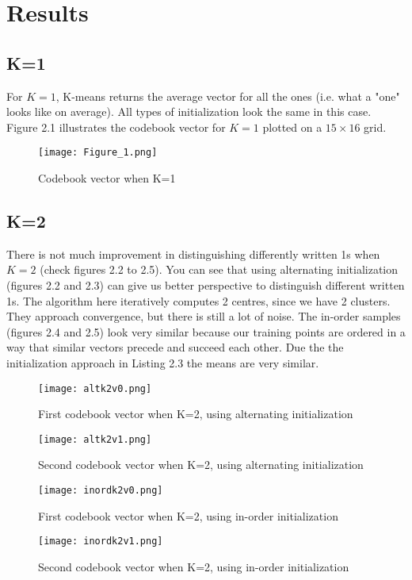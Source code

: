 \documentclass[a4paper, 11pt]{report}
\begin{document}
\section{Results}
\subsection{K=1}
For $K = 1$, K-means returns the average vector for all the ones (i.e. what a "one" looks like on average). All types of initialization look the same in this case. Figure 2.1 illustrates the codebook vector for $K = 1$ plotted on a $15 \times 16$ grid.
\begin{figure}[!ht]
    \texttt{[image: Figure\_1.png]}
    \caption{Codebook vector when K=1}
\end{figure}

\subsection{K=2}
There is not much improvement in distinguishing differently written 1s when $K=2$ (check figures 2.2 to 2.5). You can see that using alternating initialization (figures 2.2 and 2.3) can give us better perspective to distinguish different written 1s. The algorithm here iteratively computes 2 centres, since we have 2 clusters. They approach convergence, but there is still a lot of noise. The in-order samples (figures 2.4 and 2.5) look very similar because our training points are ordered in a way that similar vectors precede and succeed each other. Due the the initialization approach in Listing 2.3 the means are very similar.
\begin{figure}[!ht]
    \texttt{[image: altk2v0.png]}
    \caption{First codebook vector when K=2, using alternating initialization}
    \texttt{[image: altk2v1.png]}
    \caption{Second codebook vector when K=2, using alternating initialization}
\end{figure}
\begin{figure}[!ht]
    \texttt{[image: inordk2v0.png]}
    \caption{First codebook vector when K=2, using in-order initialization}
    \texttt{[image: inordk2v1.png]}
    \caption{Second codebook vector when K=2, using in-order initialization}
\end{figure}
\end{document}

